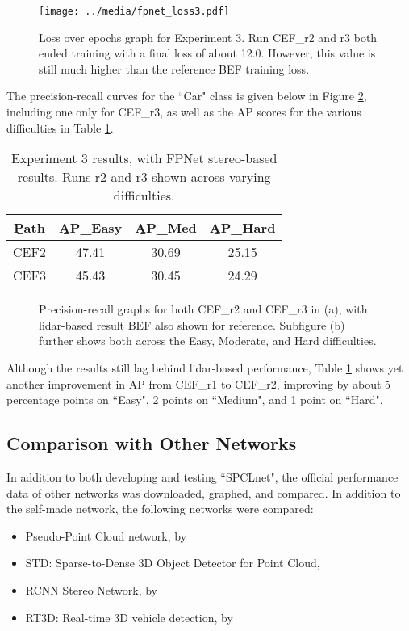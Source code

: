 \begin{figure}[ht]
	\centering
	\texttt{[image: ../media/fpnet\_loss3.pdf]}
	\caption{Loss over epochs graph for Experiment 3. Run CEF\_r2 and r3 both ended training with a final loss of about 12.0. However, this value is still much higher than the reference BEF training loss.}
	\label{fpnet_loss3}
\end{figure}


The precision-recall curves for the ``Car" class is given below in Figure \ref{fpnet_pr3}, including one only for CEF\_r3, as well as the AP scores for the various difficulties in Table \ref{fpnet_ap3}.

\begin{table}[ht]
	\centering
	\caption{Experiment 3 results, with FPNet stereo-based results. Runs r2 and r3 shown across varying difficulties.}
	\begin{tabular}{|c|c|c|c|}
		\hline
		\b{Path} & \b{AP\_Easy} & \b{AP\_Med} & \b{AP\_Hard} \\ \hline
		CEF2   &    47.41     &    30.69    &    25.15       \\ \hline
		CEF3   &    45.43     &    30.45    &    24.29       \\ \hline
	\end{tabular}
	\label{fpnet_ap3}
\end{table}

\begin{figure}[H]
	\centering
	\caption{Precision-recall graphs for both CEF\_r2 and CEF\_r3 in (a), with lidar-based result BEF also shown for reference. Subfigure (b) further shows both across the Easy, Moderate, and Hard difficulties.}
	\label{fpnet_pr3}
\end{figure}

Although the results still lag behind lidar-based performance, Table \ref{fpnet_ap3} shows yet another improvement in AP from CEF\_r1 to CEF\_r2, improving by about 5 percentage points on ``Easy", 2 points on ``Medium", and 1 point on ``Hard".


\subsection{Comparison with Other Networks} 
In addition to both developing and testing ``SPCLnet", the official performance data of other networks was downloaded, graphed, and compared. In addition to the self-made network, the following networks were compared: 
\begin{itemize}
	\item Pseudo-Point Cloud network, by \cite{wang_pseudo-lidar_2019}
	\item STD: Sparse-to-Dense 3D Object Detector for Point Cloud, \cite{yang2019std}
	\item RCNN Stereo Network, by \cite{li_stereo_2019}
	\item RT3D: Real-time 3D vehicle detection, by \cite{zeng2018rt3d}
\end{itemize}

